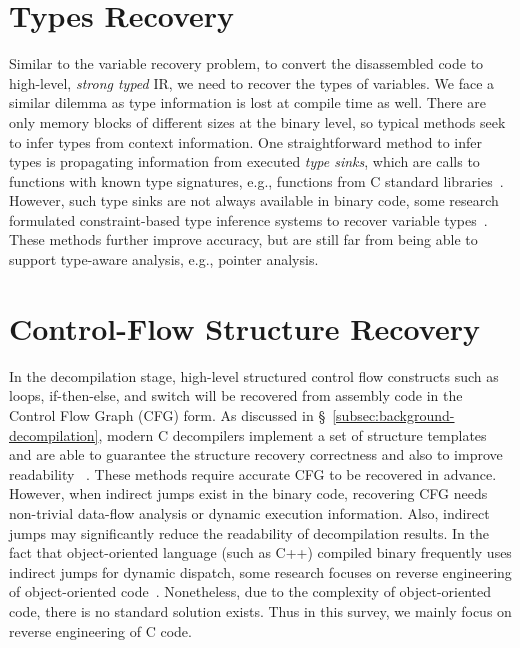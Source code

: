 \section{Types Recovery} \label{sec:challenges-types}
Similar to the variable recovery problem, to convert the disassembled code to
high-level, \textit{strong typed} IR, we need to recover the types of
variables. We face a similar dilemma as type information is lost at compile
time as well. There are only memory blocks of different sizes at the binary
level, so typical methods seek to infer types from context information.
One straightforward method to infer types is propagating information from
executed \textit{type sinks}, which are calls to functions with known type
signatures, e.g., functions from C standard libraries~\cite{lin2010automatic}.
However, such type sinks are not always available in binary code, some
research formulated constraint-based type inference systems to recover
variable types~\cite{lee2011tie,noonan2016polymorphic}. These methods further
improve accuracy, but are still far from being able to support type-aware
analysis, e.g., pointer analysis.

\section{Control-Flow Structure Recovery} \label{sec:challenges-control-flow}
In the decompilation stage, high-level structured control flow constructs such
as loops, if-then-else, and switch will be recovered from assembly code in the
Control Flow Graph (CFG) form. As discussed in
\S~\ref{subsec:background-decompilation}, modern C decompilers implement a
set of structure templates and are able to guarantee the structure recovery
correctness and also to improve readability
~\cite{brumley2013native,yakdan2015no}. These methods require accurate CFG to
be recovered in advance. However, when indirect jumps exist in the binary
code, recovering CFG needs non-trivial data-flow analysis or dynamic execution
information. Also, indirect jumps may significantly reduce the readability of
decompilation results. In the fact that object-oriented language (such as C++)
compiled binary frequently uses indirect jumps for dynamic dispatch, some
research focuses on reverse engineering of object-oriented
code~\cite{katz2016estimating,schwartz2018using,erinfolami2020devil}.
Nonetheless, due to the complexity of object-oriented code, there is no
standard solution exists. Thus in this survey, we mainly focus on reverse
engineering of C code.


\newpage

